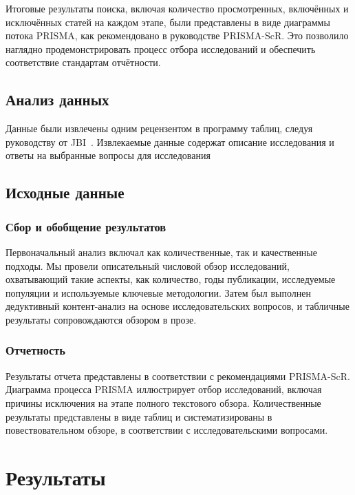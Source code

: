 \documentclass[%
]{report}
\begin{document}
Итоговые результаты поиска, включая количество просмотренных,
включённых и исключённых статей на каждом этапе,
были представлены в виде диаграммы потока PRISMA,
как рекомендовано в руководстве PRISMA-ScR.
Это позволило наглядно продемонстрировать
процесс отбора исследований и обеспечить
соответствие стандартам отчётности.

\subsection{Анализ данных}\label{data-charting-process}

Данные были извлечены одним рецензентом в программу таблиц,
следуя руководству от JBI~\cite{afc61c6cf471416489e36a4bc382d3b9}.
Извлекаемые данные содержат описание исследования и ответы на выбранные вопросы для исследования

\subsection{Исходные данные}\label{data-items}

\subsubsection{Сбор и обобщение результатов}\label{collating-and-summarising-the-results}

Первоначальный анализ включал как количественные,
так и качественные подходы.
Мы провели описательный числовой обзор исследований,
охватывающий такие аспекты, как количество,
годы публикации,
исследуемые популяции и используемые ключевые методологии.
Затем был выполнен дедуктивный
контент-анализ на основе исследовательских вопросов,
и табличные результаты сопровождаются обзором в прозе.

\subsubsection{Отчетность}\label{reporting}

Результаты отчета представлены в соответствии
с рекомендациями PRISMA-ScR.
Диаграмма процесса PRISMA иллюстрирует
отбор исследований,
включая причины исключения на этапе
полного текстового обзора.
Количественные результаты представлены
в виде таблиц и систематизированы в повествовательном обзоре,
в соответствии с исследовательскими вопросами.

\section{Результаты}\label{results}
\end{document}
